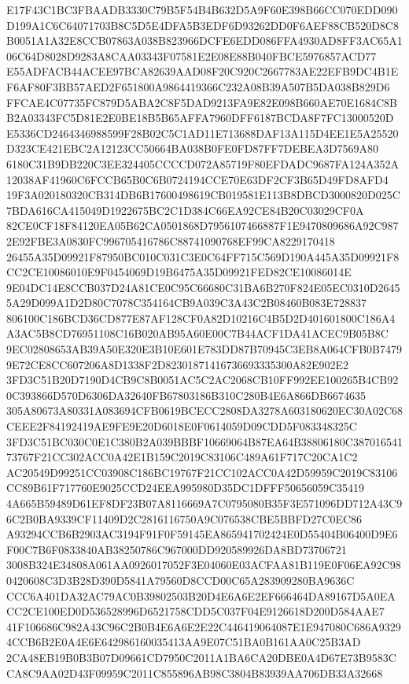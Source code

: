 \documentclass[UTF8,fontset=fandol,zihao=-4,a4paper]{ctexart}
\begin{document}
{{E17F43C1BC3FBAADB3330C79B5F54B4B632D5A9F60E398B66CC070EDD090D199A1C6C64071703B8C5D5E4DFA5B3EDF6D93262DD0F6AEF88CB520D8C8
B0051A1A32E8CCB07863A038B823966DCFE6EDD086FFA4930AD8FF3AC65A106C64D8028D9283A8CAA03343F07581E2E08E88B040FBCE5976857ACD77
E55ADFACB44ACEE97BCA82639AAD08F20C920C2667783AE22EFB9DC4B1EF6AF80F3BB57AED2F651800A9864419366C232A08B39A507B5DA038B829D6
FFCAE4C07735FC879D5ABA2C8F5DAD9213FA9E82E098B660AE70E1684C8BB2A03343FC5D81E2E0BE18B5B65AFFA7960DFF6187BCDA8F7FC13000520D
E5336CD2464346988599F28B02C5C1AD11E713688DAF13A115D4EE1E5A25520D323CE421EBC2A12123CC50664BA038B0FE0FD87FF7DEBEA3D7569A80
6180C31B9DB220C3EE324405CCCCD072A85719F80EFDADC9687FA124A352A12038AF41960C6FCCB65B0C6B0724194CCE70E63DF2CF3B65D49FD8AFD4
19F3A020180320CB314DB6B17600498619CB019581E113B8DBCD3000820D025C7BDA616CA415049D1922675BC2C1D384C66EA92CE84B20C03029CF0A
82CE0CF18F84120EA05B62CA0501868D7956107466887F1E9470809686A92C9872E92FBE3A0830FC996705416786C88741090768EF99CA8229170418
26455A35D09921F87950BC010C031C3E0C64FF715C569D190A445A35D09921F8CC2CE10086010E9F0454069D19B6475A35D09921FED82CE10086014E
9E04DC14E8CCB037D24A81CE0C95C66680C31BA6B270F824E05EC0310D26455A29D099A1D2D80C7078C354164CB9A039C3A43C2B08460B083E728837
806100C186BCD36CD877E87AF128CF0A82D10216C4B5D2D401601800C186A4A3AC5B8CD76951108C16B020AB95A60E00C7B44ACF1DA41ACEC9B05B8C
9EC02808653AB39A50E320E3B10E601E783DD87B70945C3EB8A064CFB0B74799E72CE8CC607206A8D1338F2D82301871416736693335300A82E902E2
3FD3C51B20D7190D4CB9C8B0051AC5C2AC2068CB10FF992EE100265B4CB920C393866D570D6306DA32640FB67803186B310C280B4E6A866DB6674635
305A80673A80331A083694CFB0619BCECC2808DA3278A603180620EC30A02C68CEEE2F84192419AE9FE9E20D6018E0F0614059D09CDD5F083348325C
3FD3C51BC030C0E1C380B2A039BBBF10669064B87EA64B38806180C38701654173767F21CC302ACC0A42E1B159C2019C83106C489A61F717C20CA1C2
AC20549D99251CC03908C186BC19767F21CC102ACC0A42D59959C2019C83106CC89B61F717760E9025CCD24EEA995980D35DC1DFFF50656059C35419
4A665B59489D61EF8DF23B07A8116669A7C0795080B35F3E571096DD712A43C96C2B0BA9339CF11409D2C2816116750A9C076538CBE5BBFD27C0EC86
A93294CCB6B2903AC3194F91F0F59145EA865941702424E0D55404B06400D9E6F00C7B6F0833840AB38250786C967000DD920589926DA8BD73706721
3008B324E34808A061AA0926017052F3E04060E03ACFAA81B119E0F06EA92C980420608C3D3B28D390D5841A79560D8CCD00C65A283909280BA9636C
CCC6A401DA32AC79AC0B39802503B20D4E6A6E2EF666464DA89167D5A0EACC2CE100ED0D536528996D6521758CDD5C037F04E9126618D200D584AAE7
41F106686C982A43C96C2B0B4E6A6E2E22C446419064087E1E947080C686A93294CCB6B2E0A4E6E642986160035413AA9E07C51BA0B161AA0C25B3AD
2CA48EB19B0B3B07D09661CD7950C2011A1BA6CA20DBE0A4D67E73B9583CCA8C9AA02D43F09959C2011C855896AB98C3804B83939AA706DB33A32668
}}
\end{document}
